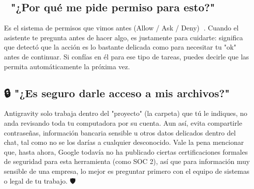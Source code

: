 \documentclass[12pt]{article}
\begin{document}
\subsection{🔔 "¿Por qué me pide permiso para esto?"}
Es el sistema de permisos que vimos antes (Allow / Ask / Deny) 🔐. Cuando el asistente te pregunta antes de hacer algo, es justamente para cuidarte: significa que detectó que la acción es lo bastante delicada como para necesitar tu "ok" antes de continuar. Si confías en él para ese tipo de tareas, puedes decirle que las permita automáticamente la próxima vez.

\subsection{🔒 "¿Es seguro darle acceso a mis archivos?"}
Antigravity solo trabaja dentro del "proyecto" (la carpeta) que tú le indiques, no anda revisando toda tu computadora por su cuenta. Aun así, evita compartirle contraseñas, información bancaria sensible u otros datos delicados dentro del chat, tal como no se los darías a cualquier desconocido. Vale la pena mencionar que, hasta ahora, Google todavía no ha publicado ciertas certificaciones formales de seguridad para esta herramienta (como SOC 2), así que para información muy sensible de una empresa, lo mejor es preguntar primero con el equipo de sistemas o legal de tu trabajo. 🛡️
\end{document}
